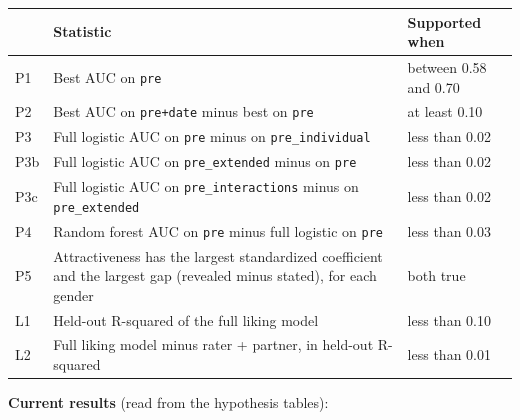\documentclass[11pt]{article}
\begin{document}
\small
\begin{center}
\begin{tabular}{lL{10cm}L{3.6cm}}
\toprule
\textbf{} & \textbf{Statistic} & \textbf{Supported when} \\
\midrule
P1 & Best AUC on \texttt{pre} & between 0.58 and 0.70 \\
P2 & Best AUC on \texttt{pre+date} minus best on \texttt{pre} & at least 0.10 \\
P3 & Full logistic AUC on \texttt{pre} minus on \texttt{pre\_individual} & less than 0.02 \\
P3b & Full logistic AUC on \texttt{pre\_extended} minus on \texttt{pre} & less than 0.02 \\
P3c & Full logistic AUC on \texttt{pre\_interactions} minus on \texttt{pre\_extended} & less than 0.02 \\
P4 & Random forest AUC on \texttt{pre} minus full logistic on \texttt{pre} & less than 0.03 \\
P5 & Attractiveness has the largest standardized coefficient and the largest gap (revealed minus stated), for each gender & both true \\
L1 & Held-out R-squared of the full liking model & less than 0.10 \\
L2 & Full liking model minus rater + partner, in held-out R-squared & less than 0.01 \\
\bottomrule
\end{tabular}
\end{center}
\normalsize

\textbf{Current results} (read from the hypothesis tables):
\end{document}
